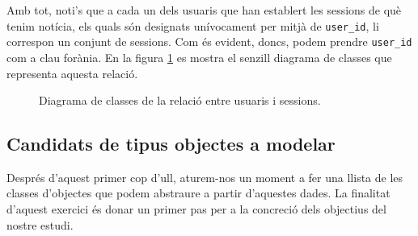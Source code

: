 \documentclass[
	a4paper,
	twoside,
	justified
]{tufte-book}
\begin{document}
Amb tot, noti's que a cada un dels usuaris que han establert les sessions de què tenim notícia, els quals són designats unívocament per mitjà de \texttt{user\_id}, li correspon un conjunt de sessions. Com és evident, doncs, podem prendre \texttt{user\_id} com a clau forània. En la figura \ref{dia:user_session_class} es mostra el senzill diagrama de classes que representa aquesta relació.

\begin{figure}
\begin{center}
\end{center}
\caption{
\label{dia:user_session_class}
	Diagrama de classes de la relació entre usuaris i sessions. 
}
\end{figure}

\subsection{Candidats de tipus objectes a modelar}

Després d'aquest primer cop d'ull, aturem-nos un moment a fer una llista de les classes d'objectes que podem abstraure a partir d'aquestes dades. La finalitat d'aquest exercici és donar un primer pas per a la concreció dels objectius del nostre estudi. 
\end{document}
